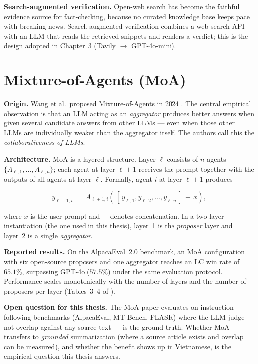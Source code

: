 \textbf{Search-augmented verification.}
Open-web search has become the faithful evidence source for
fact-checking, because no curated knowledge base keeps pace with breaking
news. Search-augmented verification combines a web-search API with an LLM
that reads the retrieved snippets and renders a verdict; this is the design
adopted in Chapter~3 (Tavily $\rightarrow$ GPT-4o-mini).

\section{Mixture-of-Agents (MoA)}

\textbf{Origin.}
Wang et al.\ proposed Mixture-of-Agents in 2024 \cite{Wang2024}. The central
empirical observation is that an LLM acting as an \textit{aggregator} produces
better answers when given several candidate answers from other LLMs ---
even when those other LLMs are individually weaker than the aggregator
itself. The authors call this the \textit{collaborativeness of LLMs}.

\textbf{Architecture.}
MoA is a layered structure. Layer $\ell$ consists of $n$ agents
$\{A_{\ell,1}, \ldots, A_{\ell,n}\}$; each agent at layer $\ell+1$ receives
the prompt together with the outputs of all agents at layer $\ell$. Formally,
agent $i$ at layer $\ell+1$ produces

\[
y_{\ell+1,i} \;=\; A_{\ell+1,i}\!\left(\,[\,y_{\ell,1}, y_{\ell,2}, \ldots, y_{\ell,n}\,] \,+\, x \right),
\]

\noindent where $x$ is the user prompt and $+$ denotes concatenation. In a
two-layer instantiation (the one used in this thesis), layer~1 is the
\textit{proposer} layer and layer~2 is a single \textit{aggregator}.

\textbf{Reported results.}
On the AlpacaEval~2.0 benchmark, an MoA configuration with six open-source
proposers and one aggregator reaches an LC win rate of $65.1\%$, surpassing
GPT-4o ($57.5\%$) under the same evaluation protocol. Performance scales
monotonically with the number of layers and the number of proposers per
layer (Tables~3--4 of \cite{Wang2024}).

\textbf{Open question for this thesis.}
The MoA paper evaluates on instruction-following benchmarks (AlpacaEval,
MT-Bench, FLASK) where the LLM judge --- not overlap against any source
text --- is the ground truth. Whether MoA transfers to \textit{grounded}
summarization (where a source article exists and overlap can
be measured), and whether the benefit shows up in Vietnamese, is the
empirical question this thesis answers.

